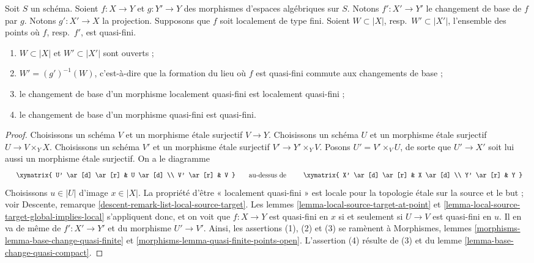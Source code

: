 \begin{lemma}
\label{lemma-base-change-quasi-finite-locus}
Soit $S$ un schéma. Soient $f : X \to Y$ et $g : Y' \to Y$ des morphismes
d'espaces algébriques sur $S$. Notons $f' : X' \to Y'$ le changement de base
de $f$ par $g$. Notons $g' : X' \to X$ la projection.
Supposons que $f$ soit localement de type fini.
Soient $W \subset |X|$, resp.\ $W' \subset |X'|$,
l'ensemble des points où $f$, resp.\ $f'$, est quasi-fini.
\begin{enumerate}
\item $W \subset |X|$ et $W' \subset |X'|$ sont ouverts ;
\item $W' = (g')^{-1}(W)$, c'est-à-dire que la formation du lieu où
$f$ est quasi-fini commute aux changements de base ;
\item le changement de base d'un morphisme localement quasi-fini est
localement quasi-fini ;
\item le changement de base d'un morphisme quasi-fini est quasi-fini.
\end{enumerate}
\end{lemma}

\begin{proof}
Choisissons un schéma $V$ et un morphisme étale surjectif $V \to Y$.
Choisissons un schéma $U$ et un morphisme étale surjectif $U \to V \times_Y X$.
Choisissons un schéma $V'$ et un morphisme étale surjectif $V' \to Y' \times_Y V$.
Posons $U' = V' \times_V U$, de sorte que $U' \to X'$ soit lui aussi un morphisme
étale surjectif. On a le diagramme
$$
\vcenter{
\xymatrix{
U' \ar[d] \ar[r] & U \ar[d] \\
V' \ar[r] & V
}
}
\quad\text{au-dessus de}\quad
\vcenter{
\xymatrix{
X' \ar[d] \ar[r] & X \ar[d] \\
Y' \ar[r] & Y
}
}
$$
Choisissons $u \in |U|$ d'image $x \in |X|$.
La propriété d'être « localement quasi-fini » est locale pour la topologie étale sur
la source et le but ; voir
Descente, remarque \ref{descent-remark-list-local-source-target}.
Les lemmes \ref{lemma-local-source-target-at-point} et
\ref{lemma-local-source-target-global-implies-local} s'appliquent donc, et
on voit que $f : X \to Y$ est quasi-fini en $x$
si et seulement si $U \to V$ est quasi-fini en $u$.
Il en va de même de $f' : X' \to Y'$ et du morphisme $U' \to V'$.
Ainsi, les assertions (1), (2) et (3) se ramènent à
Morphismes, lemmes \ref{morphisms-lemma-base-change-quasi-finite} et
\ref{morphisms-lemma-quasi-finite-points-open}.
L'assertion (4) résulte de (3) et du lemme \ref{lemma-base-change-quasi-compact}.
\end{proof}

